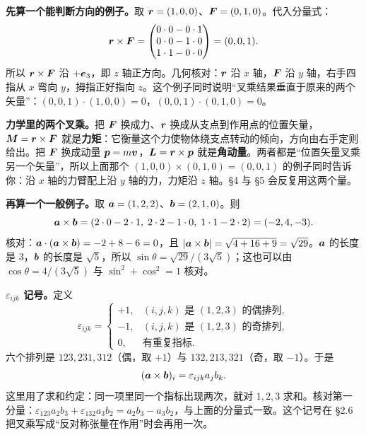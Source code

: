 \documentclass[11pt]{ctexart}
\begin{document}
\textbf{先算一个能判断方向的例子。}取 $\boldsymbol{r}=(1,0,0)$、$\boldsymbol{F}=(0,1,0)$。代入分量式：
\[
\boldsymbol{r}\times\boldsymbol{F}=
\begin{pmatrix}
0\cdot0-0\cdot1\\
0\cdot0-1\cdot0\\
1\cdot1-0\cdot0
\end{pmatrix}
=(0,0,1).
\]
所以 $\boldsymbol{r}\times\boldsymbol{F}$ 沿 $+\boldsymbol{e}_3$，即 $z$ 轴正方向。几何核对：$\boldsymbol{r}$ 沿 $x$ 轴，$\boldsymbol{F}$ 沿 $y$ 轴，右手四指从 $x$ 弯向 $y$，拇指正好指向 $z$。这个例子同时说明“叉乘结果垂直于原来的两个矢量”：$(0,0,1)\cdot(1,0,0)=0$，$(0,0,1)\cdot(0,1,0)=0$。

\textbf{力学里的两个叉乘。}把 $\boldsymbol{F}$ 换成力、$\boldsymbol{r}$ 换成从支点到作用点的位置矢量，$\boldsymbol{M}=\boldsymbol{r}\times\boldsymbol{F}$ 就是\textbf{力矩}：它衡量这个力使物体绕支点转动的倾向，方向由右手定则给出。把 $\boldsymbol{F}$ 换成动量 $\boldsymbol{p}=m\boldsymbol{v}$，$\boldsymbol{L}=\boldsymbol{r}\times\boldsymbol{p}$ 就是\textbf{角动量}。两者都是“位置矢量叉乘另一个矢量”，所以上面那个 $(1,0,0)\times(0,1,0)=(0,0,1)$ 的例子同时告诉你：沿 $x$ 轴的力臂配上沿 $y$ 轴的力，力矩沿 $z$ 轴。\S4 与 \S5 会反复用这两个量。

\textbf{再算一个一般例子。}取 $\boldsymbol{a}=(1,2,2)$、$\boldsymbol{b}=(2,1,0)$。则
\[
\boldsymbol{a}\times\boldsymbol{b}=(2\cdot0-2\cdot1,\;2\cdot2-1\cdot0,\;1\cdot1-2\cdot2)=(-2,4,-3).
\]
核对：$\boldsymbol{a}\cdot(\boldsymbol{a}\times\boldsymbol{b})=-2+8-6=0$，且 $|\boldsymbol{a}\times\boldsymbol{b}|=\sqrt{4+16+9}=\sqrt{29}$。$\boldsymbol{a}$ 的长度是 $3$，$\boldsymbol{b}$ 的长度是 $\sqrt5$，所以 $\sin\theta=\sqrt{29}/(3\sqrt5)$；这也可以由 $\cos\theta=4/(3\sqrt5)$ 与 $\sin^2+\cos^2=1$ 核对。

\textbf{$\varepsilon_{ijk}$ 记号。}定义
\[
\varepsilon_{ijk}=
\begin{cases}
+1,&(i,j,k)\text{ 是 }(1,2,3)\text{ 的偶排列},\\
-1,&(i,j,k)\text{ 是 }(1,2,3)\text{ 的奇排列},\\
0,&\text{有重复指标}.
\end{cases}
\]
六个排列是 $123,231,312$（偶，取 $+1$）与 $132,213,321$（奇，取 $-1$）。于是
\[
(\boldsymbol{a}\times\boldsymbol{b})_i=\varepsilon_{ijk}a_jb_k .
\]
这里用了求和约定：同一项里同一个指标出现两次，就对 $1,2,3$ 求和。核对第一分量：$\varepsilon_{123}a_2b_3+\varepsilon_{132}a_3b_2=a_2b_3-a_3b_2$，与上面的分量式一致。这个记号在 \S2.6 把叉乘写成“反对称张量在作用”时会再用一次。
\end{document}

